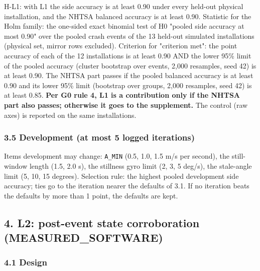 H-L1: with L1 the side accuracy is at least 0.90 under every held-out physical installation, and the NHTSA balanced accuracy is at least 0.90. Statistic for the Holm family: the one-sided exact binomial test of H0 "pooled side accuracy at most 0.90" over the pooled crash events of the 13 held-out simulated installations (physical set, mirror rows excluded). Criterion for "criterion met": the point accuracy of each of the 12 installations is at least 0.90 AND the lower 95\% limit of the pooled accuracy (cluster bootstrap over events, 2,000 resamples, seed 42) is at least 0.90. The NHTSA part passes if the pooled balanced accuracy is at least 0.90 and its lower 95\% limit (bootstrap over groups, 2,000 resamples, seed 42) is at least 0.85. \textbf{Per G0 rule 4, L1 is a contribution only if the NHTSA part also passes; otherwise it goes to the supplement.} The control (raw axes) is reported on the same installations.

\subsubsection*{3.5 Development (at most 5 logged iterations)}

Items development may change: \texttt{A\_MIN} (0.5, 1.0, 1.5 m/s per second), the still-window length (1.5, 2.0 s), the stillness gyro limit (2, 3, 5 deg/s), the stale-angle limit (5, 10, 15 degrees). Selection rule: the highest pooled development side accuracy; ties go to the iteration nearer the defaults of 3.1. If no iteration beats the defaults by more than 1 point, the defaults are kept.

\subsection*{4. L2: post-event state corroboration (MEASURED\_SOFTWARE)}

\subsubsection*{4.1 Design}

